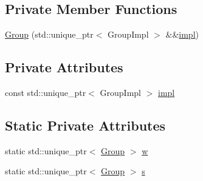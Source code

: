 \subsection*{Private Member Functions}
\begin{DoxyCompactItemize}
\item 
\hyperlink{classshark_1_1_group_a2222ee01c6bacb1441428089fb29916a}{Group} (std\+::unique\+\_\+ptr$<$ Group\+Impl $>$ \&\&\hyperlink{classshark_1_1_group_a1b1f4345bb3d08df22d32c13bd693580}{impl})
\end{DoxyCompactItemize}
\subsection*{Private Attributes}
\begin{DoxyCompactItemize}
\item 
const std\+::unique\+\_\+ptr$<$ Group\+Impl $>$ \hyperlink{classshark_1_1_group_a1b1f4345bb3d08df22d32c13bd693580}{impl}
\end{DoxyCompactItemize}
\subsection*{Static Private Attributes}
\begin{DoxyCompactItemize}
\item 
static std\+::unique\+\_\+ptr$<$ \hyperlink{classshark_1_1_group}{Group} $>$ \hyperlink{classshark_1_1_group_af542c8e71a81c12d6a73203ef9152d1f}{w}
\item 
static std\+::unique\+\_\+ptr$<$ \hyperlink{classshark_1_1_group}{Group} $>$ \hyperlink{classshark_1_1_group_a6c59f34c15be2873372cd006c2939da2}{s}
\end{DoxyCompactItemize}
